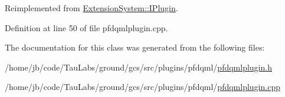 \-Reimplemented from \hyperlink{class_extension_system_1_1_i_plugin_a65c16ebd3a6e89918a99af6515fe68cb}{\-Extension\-System\-::\-I\-Plugin}.



\-Definition at line 50 of file pfdqmlplugin.\-cpp.



\-The documentation for this class was generated from the following files\-:\begin{DoxyCompactItemize}
\item 
/home/jb/code/\-Tau\-Labs/ground/gcs/src/plugins/pfdqml/\hyperlink{pfdqmlplugin_8h}{pfdqmlplugin.\-h}\item 
/home/jb/code/\-Tau\-Labs/ground/gcs/src/plugins/pfdqml/\hyperlink{pfdqmlplugin_8cpp}{pfdqmlplugin.\-cpp}\end{DoxyCompactItemize}
